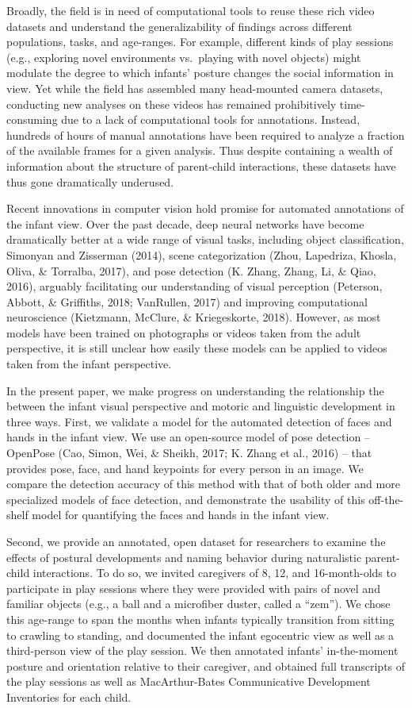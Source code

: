 \documentclass[english,man]{apa6}
\begin{document}
Broadly, the field is in need of computational tools to reuse these rich
video datasets and understand the generalizability of findings across
different populations, tasks, and age-ranges. For example, different
kinds of play sessions (e.g., exploring novel environments vs.~playing
with novel objects) might modulate the degree to which infants' posture
changes the social information in view. Yet while the field has
assembled many head-mounted camera datasets, conducting new analyses on
these videos has remained prohibitively time-consuming due to a lack of
computational tools for annotations. Instead, hundreds of hours of
manual annotations have been required to analyze a fraction of the
available frames for a given analysis. Thus despite containing a wealth
of information about the structure of parent-child interactions, these
datasets have thus gone dramatically underused.

Recent innovations in computer vision hold promise for automated
annotations of the infant view. Over the past decade, deep neural
networks have become dramatically better at a wide range of visual
tasks, including object classification, Simonyan and Zisserman (2014),
scene categorization (Zhou, Lapedriza, Khosla, Oliva, \& Torralba,
2017), and pose detection (K. Zhang, Zhang, Li, \& Qiao, 2016), arguably
facilitating our understanding of visual perception (Peterson, Abbott,
\& Griffiths, 2018; VanRullen, 2017) and improving computational
neuroscience (Kietzmann, McClure, \& Kriegeskorte, 2018). However, as
most models have been trained on photographs or videos taken from the
adult perspective, it is still unclear how easily these models can be
applied to videos taken from the infant perspective.

In the present paper, we make progress on understanding the relationship
the between the infant visual perspective and motoric and linguistic
development in three ways. First, we validate a model for the automated
detection of faces and hands in the infant view. We use an open-source
model of pose detection -- OpenPose (Cao, Simon, Wei, \& Sheikh, 2017;
K. Zhang et al., 2016) -- that provides pose, face, and hand keypoints
for every person in an image. We compare the detection accuracy of this
method with that of both older and more specialized models of face
detection, and demonstrate the usability of this off-the-shelf model for
quantifying the faces and hands in the infant view.

Second, we provide an annotated, open dataset for researchers to examine
the effects of postural developments and naming behavior during
naturalistic parent-child interactions. To do so, we invited caregivers
of 8, 12, and 16-month-olds to participate in play sessions where they
were provided with pairs of novel and familiar objects (e.g., a ball and
a microfiber duster, called a \enquote{zem}). We chose this age-range to
span the months when infants typically transition from sitting to
crawling to standing, and documented the infant egocentric view as well
as a third-person view of the play session. We then annotated infants'
in-the-moment posture and orientation relative to their caregiver, and
obtained full transcripts of the play sessions as well as
MacArthur-Bates Communicative Development Inventories for each child.
\end{document}
